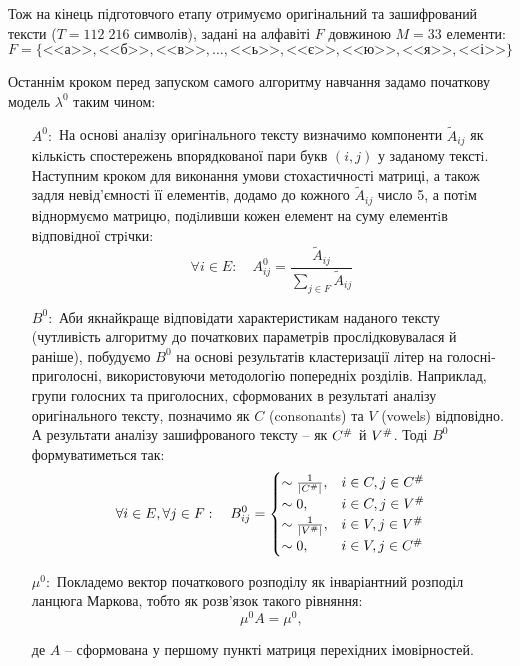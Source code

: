 Тож на кінець підготовчого етапу отримуємо оригінальний та зашифрований тексти ($T=112\; 216$ символів), задані на алфавіті $F$ довжиною $M=33$ елементи:
\begin{equation}
    F=\{\text{<<а>>},\text{<<б>>},\text{<<в>>},\ldots,\text{<<ь>>},\text{<<є>>},\text{<<ю>>},\text{<<я>>},\text{<<і>>}\}
    \label{formula: UKR chipher alphabet}
\end{equation}

Останнім кроком перед запуском самого алгоритму навчання задамо початкову модель $\lambda^0$ таким чином:
\begin{enumerate}
    \item[$A^0:$] На основі аналізу оригінального тексту визначимо компоненти $\widetilde{A}_{ij}$ як кiлькiсть спостережень впорядкованої пари букв $(i, j)$ у  заданому текстi. Наступним кроком для виконання умови стохастичності матриці, а також задля невід'ємності її елементів, додамо до кожного $\widetilde{A}_{ij}$ число 5, а потiм віднормуємо матрицю, подiливши кожен елемент на суму елементiв вiдповiдної стрiчки:
    \[ \forall i\in E: \quad A_{ij}^0=\frac{\widetilde{A}_{ij}}{\sum\limits_{j\in F}\widetilde{A}_{ij}} \]

    \item[$B^0:$] Аби якнайкраще відповідати характеристикам наданого тексту (чутливість алгоритму до початкових параметрів прослідковувалася й раніше), побудуємо $B^0$ на основі результатів кластеризації літер на голосні-приголосні, використовуючи методологію попередніх розділів. Наприклад, групи голосних та приголосних, сформованих в результаті аналізу оригінального тексту, позначимо як $C$ (consonants) та $V$ (vowels) відповідно. А результати аналізу зашифрованого тексту -- як $C^{\text{\scriptsize \#}}$ й $V^{\text{\scriptsize \#}}$.  Тоді $B^0$ формуватиметься так:
    \begin{equation*}
        \forall i\in E, \forall j\in F: \quad B_{ij}^0=
        \begin{cases}
            \sim\frac{1}{|C^{\text{\tiny \#}}|}, & i\in C, j\in C^{\text{\scriptsize \#}} \\
            \sim 0, & i\in C, j\in V^{\text{\scriptsize \#}} \\
            \sim\frac{1}{|V^{\text{\tiny \#}}|}, & i\in V, j\in V^{\text{\scriptsize \#}} \\
            \sim 0, & i\in V, j\in C^{\text{\scriptsize \#}}\\
        \end{cases}
    \end{equation*}

    \item[$\mu^0:$] Покладемо вектор початкового розподілу як інваріантний розподіл ланцюга Маркова, тобто як розв'язок такого рівняння:
    \[ \mu^0A=\mu^0, \]

    де $A$ -- сформована у першому пункті матриця перехідних імовірностей.
\end{enumerate}

